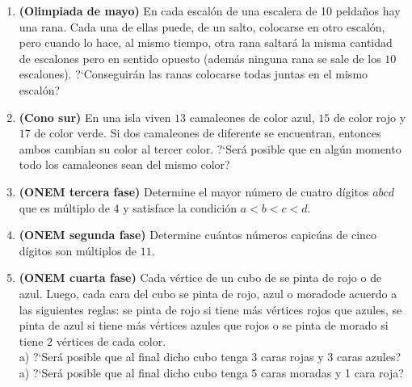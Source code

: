 \documentclass[10pt,a4 paper]{article}
\begin{document}
\begin{enumerate}
\item \textbf{(Olimpiada de mayo)} En cada escal\'on de una escalera de 10 pelda\~nos hay una rana. Cada una de ellas puede, de un salto, colocarse en otro escal\'on, pero cuando lo hace, al mismo tiempo, otra rana saltar\'a la misma cantidad de escalones pero en sentido opuesto (adem\'as ninguna rana se sale de los $10$ escalones). ?`Conseguir\'an las ranas colocarse todas juntas en el mismo escal\'on?  
\item \textbf{(Cono sur)} En una isla viven $13$ camaleones de color azul, $15$ de color rojo y $17$ de color verde. Si dos camaleones de diferente se encuentran, entonces ambos cambian su color al tercer color. ?`Ser\'a posible que en alg\'un momento todo los camaleones sean del mismo color?

\item \textbf{(ONEM tercera fase)} Determine el mayor n\'umero de cuatro d\'igitos $abcd$ que es m\'ultiplo de 4 y satisface la condici\'on $a < b < c < d$. 

\item \textbf{(ONEM segunda fase)} Determine cu\'antos n\'umeros capic\'uas de cinco d\'igitos son m\'ultiplos de $11$. 

\item \textbf{(ONEM cuarta fase)} Cada v\'ertice de un cubo de se pinta de rojo o de azul. Luego, cada cara del cubo se pinta de rojo, azul o moradode acuerdo a las siguientes reglas: se pinta de rojo si tiene m\'as v\'ertices rojos que azules, se pinta de azul si tiene m\'as v\'ertices azules que rojos o se pinta de morado si tiene $2$ v\'ertices de cada color. \\
a) ?`Ser\'a posible que al final dicho cubo tenga $3$ caras rojas y $3$ caras azules? \\
a) ?`Ser\'a posible que al final dicho cubo tenga $5$ caras moradas y 1 cara roja? \\



\end{enumerate}
\end{document}
